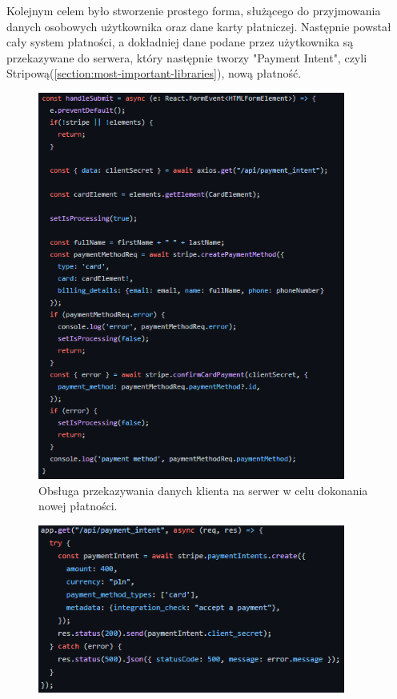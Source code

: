 \documentclass[12pt]{article}
\begin{document}
\begin{sloppypar}
{  Kolejnym celem było stworzenie prostego forma, służącego do przyjmowania danych osobowych użytkownika oraz dane karty płatniczej. Następnie powstał cały system płatności, 
  a dokładniej dane podane przez użytkownika są przekazywane do serwera, który następnie tworzy "Payment Intent", czyli Stripową(\ref{section:most-important-libraries}), 
  nową płatność.
  \begin{figure}[H]
    \centering
    \includegraphics[width=0.9\textwidth]{Creation_process/client_stripe.PNG}
    \caption{Obsługa przekazywania danych klienta na serwer w celu dokonania nowej płatności.}
    \label{fig:client-stripe}
  \end{figure}
  \begin{figure}[H]
    \centering
    \includegraphics[width=0.9\textwidth]{Creation_process/server_stripe.PNG}

\end{figure}}
\end{sloppypar}
\end{document}
